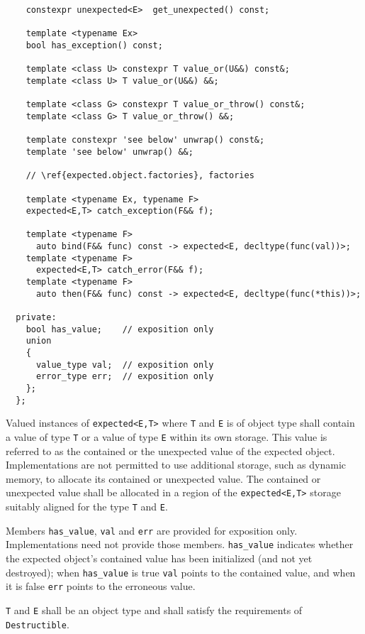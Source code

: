 \documentclass[a4paper,10pt]{article}
\newcommand{\cpp}[1]{\lstinline{#1}}
\begin{document}
\begin{lstlisting}
    constexpr unexpected<E>  get_unexpected() const;
    
    template <typename Ex>
    bool has_exception() const;
      
    template <class U> constexpr T value_or(U&&) const&;
    template <class U> T value_or(U&&) &&;
    
    template <class G> constexpr T value_or_throw() const&;
    template <class G> T value_or_throw() &&;

    template constexpr 'see below' unwrap() const&;
    template 'see below' unwrap() &&;

    // \ref{expected.object.factories}, factories

    template <typename Ex, typename F>
    expected<E,T> catch_exception(F&& f);

    template <typename F>
      auto bind(F&& func) const -> expected<E, decltype(func(val))>;
    template <typename F>
      expected<E,T> catch_error(F&& f);
    template <typename F>
      auto then(F&& func) const -> expected<E, decltype(func(*this))>;
  
  private:
    bool has_value;    // exposition only
    union
    {
      value_type val;  // exposition only
      error_type err;  // exposition only
    };
  };

\end{lstlisting}


Valued instances of \cpp{expected<E,T>} where \cpp{T} and \cpp{E} is of object type shall contain a value of type \cpp{T} or a value of type \cpp{E} within its own storage. This value is referred to as the contained or the unexpected value of the expected object. Implementations are not permitted to use additional storage, such as dynamic memory, to allocate its contained or unexpected value. The contained or unexpected value shall be allocated in a region of the \cpp{expected<E,T>} storage suitably aligned for the type \cpp{T} and \cpp{E}.
\newline

Members \cpp{has_value}, \cpp{val} and \cpp{err} are provided for exposition only. Implementations need not provide those members. \cpp{has_value} indicates whether the expected object's contained value has been initialized (and not yet destroyed); when \cpp{has_value} is true \cpp{val} points to the contained value, and when it is false \cpp{err} points to the erroneous value. 

\cpp{T} and \cpp{E} shall be an object type and shall satisfy the requirements of \cpp{Destructible}.
\end{document}
